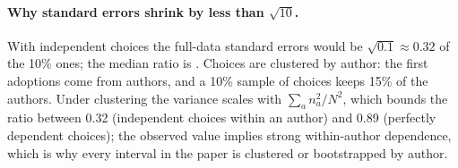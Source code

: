 \paragraph{Why standard errors shrink by less than $\sqrt{10}$.}
With independent choices the full-data standard errors would be $\sqrt{0.1} \approx 0.32$ of the 10\% ones; the
median ratio is \valSeRatio. Choices are clustered by author: the \nFirst{} first adoptions come from \nFirstAuthors{}
authors, and a 10\% sample of choices keeps 15\% of the authors. Under clustering the variance scales with
$\sum_a n_a^2 / N^2$, which bounds the ratio between 0.32 (independent choices within an author) and 0.89 (perfectly
dependent choices); the observed value implies strong within-author dependence, which is why every interval in the
paper is clustered or bootstrapped by author.


